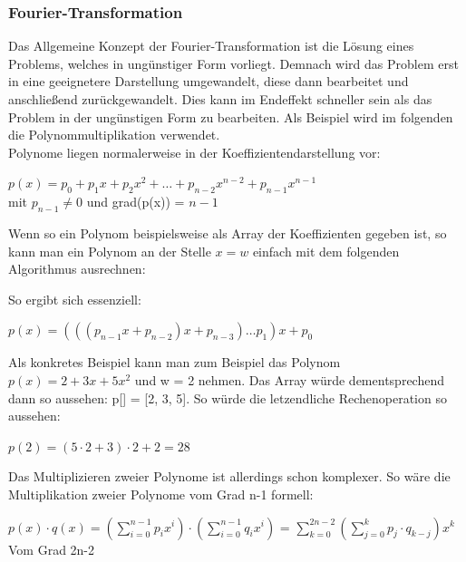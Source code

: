 \documentclass[
../../AuD-Zusammenfassung.tex,
]
{subfiles}
\begin{document}
\subsubsection{Fourier-Transformation}
Das Allgemeine Konzept der Fourier-Transformation ist die Lösung eines Problems, welches in ungünstiger Form vorliegt. Demnach wird das Problem erst in eine geeignetere Darstellung umgewandelt, diese dann bearbeitet und anschließend zurückgewandelt. Dies kann im Endeffekt schneller sein als das Problem in der ungünstigen Form zu bearbeiten. Als Beispiel wird im folgenden die Polynommultiplikation verwendet.\\
Polynome liegen normalerweise in der Koeffizientendarstellung vor:
\begin{center}
    $p(x) = p_0 + p_1x + p_2x^2 + \ldots + p_{n-2}x^{n-2} + p_{n-1}x^{n-1}$\\
    mit $p_{n-1} \not= 0$ und grad(p(x)) = $n - 1$
\end{center}
Wenn so ein Polynom beispielsweise als Array der Koeffizienten gegeben ist, so kann man ein Polynom an der Stelle $x = w$ einfach mit dem folgenden Algorithmus ausrechnen:\\
\begin{algorithm}[H]
\end{algorithm}
So ergibt sich essenziell:
\begin{center}
    $p(x) = (((p_{n-1}x + p_{n-2})x + p_{n-3})\ldots p_1)x + p_0$
\end{center}
Als konkretes Beispiel kann man zum Beispiel das Polynom $p(x) = 2 + 3x + 5x^2$ und w = 2 nehmen. Das Array würde dementsprechend dann so aussehen: p[] = [2, 3, 5].
So würde die letzendliche Rechenoperation so aussehen:
\begin{center}
    $p(2) = (5 \cdot 2 + 3) \cdot 2 + 2 = 28$ 
\end{center}
\newpage
Das Multiplizieren zweier Polynome ist allerdings schon komplexer. So wäre die Multiplikation zweier Polynome vom Grad n-1 formell: 
\begin{center}
    $p(x) \cdot q(x) = (\sum_{i=0}^{n-1}p_ix^i) \cdot (\sum_{i=0}^{n-1}q_ix^i)$ = $\sum_{k=0}^{2n-2}(\sum_{j=0}^{k}p_j\cdot q_{k-j})x^k$\\
    Vom Grad 2n-2
\end{center}
\end{document}
